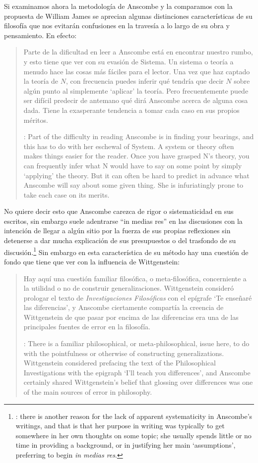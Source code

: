 Si examinamos ahora la metodología de Anscombe y la comparamos con la propuesta de William James se aprecian algunas distinciones características de su filosofía que nos evitarán confusiones en la travesía a lo largo de su obra y pensamiento. En efecto: \blockquote[{\cite[1]{teichmann2008ans}}: Part of the difficulty in reading Anscombe is in finding your bearings, and this has to do with her eschewal of System. A system or theory often makes things easier for the reader. Once you have grasped N's theory, you can frequently infer what N would have to say on some point by simply `applying' the theory. But it can often be hard to predict in advance what Anscombe will say about some given thing. She is infuriatingly prone to take each case on its merits.]{Parte de la dificultad en leer a Anscombe está en encontrar nuestro rumbo, y esto tiene que ver con su evasión de Sistema. Un sistema o teoría a menudo hace las cosas más fáciles para el lector. Una vez que haz captado la teoría de $N$, con frecuencia puedes inferir qué tendría que decir $N$ sobre algún punto al simplemente \enquote*{aplicar} la teoría. Pero frecuentemente puede ser difícil predecir de antemano qué dirá Anscombe acerca de alguna cosa dada. Tiene la exasperante tendencia a tomar cada caso en sus propios méritos.} No quiere decir esto que Anscombe carezca de rigor o sistematicidad en sus escritos, sin embargo suele adentrarse \enquote{in medias res} en las discusiones con la intención de llegar a algún sitio por la fuerza de sus propias reflexiones sin detenerse a dar mucha explicación de sus presupuestos o del trasfondo de su discusión.\footnote{\cite[Cf.~][1]{teichmann2008ans}: \textelp{} there is another reason for the lack of apparent systematicity in Anscombe's writings, and that is that her purpose in writing was typically to get somewhere in her own thoughts on some topic; she usually spends little or no time in providing a background, or in justifying her main `assumptions', preferring to begin \emph{in medias res}.} Sin embargo en esta característica de su método hay una cuestión de fondo que tiene que ver con la influencia de Wittgenstein: \blockquote[{\cite[1]{teichmann2008ans}}: There is a familiar philosophical, or meta-philosophical, issue here, to do with the pointfulness or otherwise of constructing generalizations. Wittgenstein considered prefacing the text of the Philosophical Investigations with the epigraph `I'll teach you differences', and Anscombe certainly shared Wittgenstein's belief that glossing over differences was one of the main sources of error in philosophy.]{Hay aquí una cuestión familiar filosófica, o meta-filosófica, concerniente a la utilidad o no de construir generalizaciones. Wittgenstein consideró prologar el texto de \emph{Investigaciones Filosóficas} con el epígrafe \enquote*{Te enseñaré las diferencias}, y Anscombe ciertamente compartía la creencia de Wittgenstein de que pasar por encima de las diferencias era una de las principales fuentes de error en la filosofía.}

